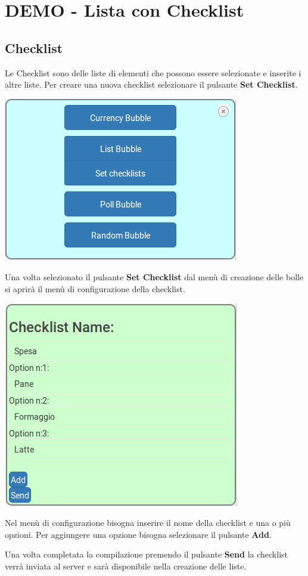 \newpage

\section{DEMO - Lista con Checklist}

\subsection{Checklist}

\begin{flushleft}
Le Checklist sono delle liste di elementi che possono essere selezionate e inserite i altre liste.
Per creare una nuova checklist selezionare il pulsante \textbf{Set Checklist}.\\
\begin{center}
\includegraphics[scale=0.75]{img/menu.png}
\end{center}

Una volta selezionato il pulsante \textbf{Set Checklist} dal menù di creazione delle bolle si aprirà il menù di configurazione della checklist.\\
\begin{center}
\includegraphics[scale=0.75]{img/checklist_conf.png}
\end{center}

Nel menù di configurazione bisogna inserire il nome della checklist e una o più opzioni.
Per aggiungere una opzione bisogna selezionare il pulsante \textbf{Add}.

Una volta completata la compilazione premendo il pulsante \textbf{Send} la checklist verrà inviata al server e sarà disponibile nella creazione delle liste.
\end{flushleft}

